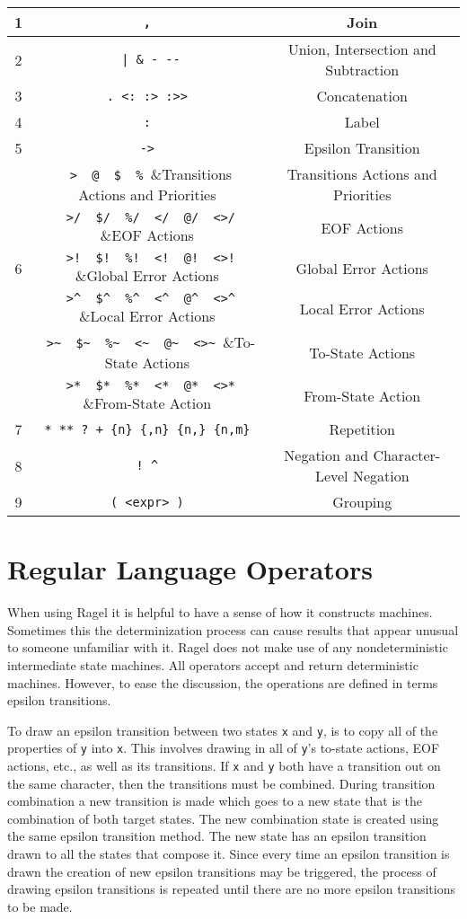 \documentclass[letterpaper,11pt,oneside]{book}
\newcommand{\verbspace}{\vspace{10pt}}
\begin{document}
\verbspace
\begin{tabular}{|c|c|c|}
\hline
1&\verb| , |&Join\\
\hline
2&\verb/ | & - --/&Union, Intersection and Subtraction\\
\hline
3&\verb| . <: :> :>> |&Concatenation\\
\hline
4&\verb| : |&Label\\
\hline
5&\verb| -> |&Epsilon Transition\\
\hline
&\verb| >  @  $  % |&Transitions Actions and Priorities\\
\cline{2-3}
&\verb| >/  $/  %/  </  @/  <>/ |&EOF Actions\\
\cline{2-3}
6&\verb| >!  $!  %!  <!  @!  <>! |&Global Error Actions\\
\cline{2-3}
&\verb| >^  $^  %^  <^  @^  <>^ |&Local Error Actions\\
\cline{2-3}
&\verb| >~  $~  %~  <~  @~  <>~ |&To-State Actions\\
\cline{2-3}
&\verb| >*  $*  %*  <*  @*  <>* |&From-State Action\\
\hline
7&\verb| * ** ? + {n} {,n} {n,} {n,m} |&Repetition\\
\hline
8&\verb| ! ^ |&Negation and Character-Level Negation\\
\hline
9&\verb| ( <expr> ) |&Grouping\\
\hline
\end{tabular}

\section{Regular Language Operators}
\label{machconst}

When using Ragel it is helpful to have a sense of how it constructs machines.
Sometimes this the determinization process can cause results that appear unusual to someone
unfamiliar with it. Ragel does not make use of any nondeterministic
intermediate state machines. All operators accept and return deterministic
machines. However, to ease the discussion, the operations are defined in terms
epsilon transitions.

To draw an epsilon transition between two states \verb|x| and \verb|y|, is to
copy all of the properties of \verb|y| into \verb|x|. This involves drawing in
all of \verb|y|'s to-state actions, EOF actions, etc., as well as its
transitions. If \verb|x| and \verb|y| both have a transition out on the same
character, then the transitions must be combined.  During transition
combination a new transition is made which goes to a new state that is the
combination of both target states. The new combination state is created using
the same epsilon transition method.  The new state has an epsilon transition
drawn to all the states that compose it. Since every time an epsilon transition
is drawn the creation of new epsilon transitions may be triggered, the process
of drawing epsilon transitions is repeated until there are no more epsilon
transitions to be made.
\end{document}
